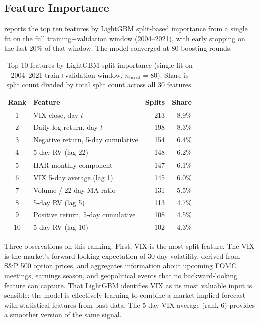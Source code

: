\subsection{Feature Importance}

 reports the top ten features by LightGBM split-based importance from a single fit on the full training+validation window (2004--2021), with early stopping on the last 20\% of that window. The model converged at 80 boosting rounds.

\begin{table}[H]
\centering
\caption{Top 10 features by LightGBM split-importance (single fit on 2004--2021 train+validation window, $n_{\text{boost}} = 80$). Share is split count divided by total split count across all 30 features.}
\label{tab:feature_importance}
\begin{tabular}{c l r r}
\toprule
\textbf{Rank} & \textbf{Feature} & \textbf{Splits} & \textbf{Share} \\
\midrule
1  & VIX close, day $t$                        & 213 & 8.9\% \\
2  & Daily log return, day $t$                 & 198 & 8.3\% \\
3  & Negative return, 5-day cumulative         & 154 & 6.4\% \\
4  & 5-day RV (lag 22)                         & 148 & 6.2\% \\
5  & HAR monthly component                     & 147 & 6.1\% \\
6  & VIX 5-day average (lag 1)                 & 145 & 6.0\% \\
7  & Volume / 22-day MA ratio                  & 131 & 5.5\% \\
8  & 5-day RV (lag 5)                          & 113 & 4.7\% \\
9  & Positive return, 5-day cumulative         & 108 & 4.5\% \\
10 & 5-day RV (lag 10)                         & 102 & 4.3\% \\
\bottomrule
\end{tabular}
\end{table}

Three observations on this ranking. First, VIX is the most-split feature. The VIX is the market's forward-looking expectation of 30-day volatility, derived from S\&P 500 option prices, and aggregates information about upcoming FOMC meetings, earnings season, and geopolitical events that no backward-looking feature can capture. That LightGBM identifies VIX as its most valuable input is sensible: the model is effectively learning to combine a market-implied forecast with statistical features from past data. The 5-day VIX average (rank 6) provides a smoother version of the same signal.

